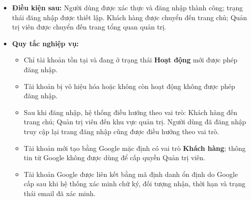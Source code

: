 \documentclass[12pt,a4paper]{article}
\begin{document}
\begin{itemize}
\begin{itemize}
        \item Nếu tài khoản không tồn tại, hệ thống thông báo tài khoản không tồn tại và cho phép người dùng chuyển sang UC01 -- Đăng ký.
        \item Nếu mật khẩu không chính xác, hệ thống thông báo mật khẩu không đúng và yêu cầu người dùng nhập lại.
        \item Nếu người dùng hủy xác thực Google, Google Identity trả lỗi hoặc thông tin xác thực không hợp lệ, hệ thống từ chối đăng nhập và thông báo phù hợp.
        \item Nếu email Google đã thuộc một tài khoản hiện có nhưng chưa được liên kết, hệ thống không tự động gộp tài khoản; người dùng phải xác thực tài khoản hiện có để liên kết.
        \item Nếu tài khoản ở trạng thái \textbf{Không còn hoạt động}, hệ thống thông báo tài khoản không tồn tại và từ chối đăng nhập.
        \item Nếu tài khoản ở trạng thái \textbf{Bị vô hiệu hóa}, hệ thống thông báo tài khoản đã bị vô hiệu hóa và từ chối đăng nhập.
        \item Nếu không thể thiết lập trạng thái đăng nhập, hệ thống thông báo xảy ra lỗi trong quá trình đăng nhập và yêu cầu người dùng thực hiện lại.
    \end{itemize}
    \item \textbf{Điều kiện sau:} Người dùng được xác thực và đăng nhập thành công; trạng thái đăng nhập được thiết lập. Khách hàng được chuyển đến trang chủ; Quản trị viên được chuyển đến trang tổng quan quản trị.
    \item \textbf{Quy tắc nghiệp vụ:}
    \begin{itemize}
        \item Chỉ tài khoản tồn tại và đang ở trạng thái \textbf{Hoạt động} mới được phép đăng nhập.
        \item Tài khoản bị vô hiệu hóa hoặc không còn hoạt động không được phép đăng nhập.
        \item Sau khi đăng nhập, hệ thống điều hướng theo vai trò: Khách hàng đến trang chủ; Quản trị viên đến khu vực quản trị. Người dùng đã đăng nhập truy cập lại trang đăng nhập cũng được điều hướng theo vai trò.
        \item Tài khoản mới tạo bằng Google mặc định có vai trò \textbf{Khách hàng}; thông tin từ Google không được dùng để cấp quyền Quản trị viên.
        \item Tài khoản Google được liên kết bằng mã định danh ổn định do Google cấp sau khi hệ thống xác minh chữ ký, đối tượng nhận, thời hạn và trạng thái email đã xác minh.
    \end{itemize}
\end{itemize}
\end{document}
